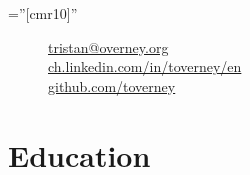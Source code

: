 \documentclass[a4paper,11pt]{article} %
\begin{document}
\pagestyle{empty} %

\font\fb=''[cmr10]'' %



\par{
\bigskip
\par
} %

\begin{figure}
\vspace{-3.5cm}
\footnotesize

\begin{flushright}

\hspace{1cm}
\href{mailto:tristan@overney.org}{tristan@overney.org} 
\hspace{0.1cm}
\faEnvelope{}
\\ 

\href{https://www.linkedin.com/in/toverney/en}{ch.linkedin.com/in/toverney/en}
\hspace{0.1cm}
\faLinkedin{}
\\

\href{https://github.com/toverney}{github.com/toverney}
\hspace{0.1cm} 
\faGithub{}
\\


\end{flushright}

\end{figure}


\section{Education}
\end{document}
